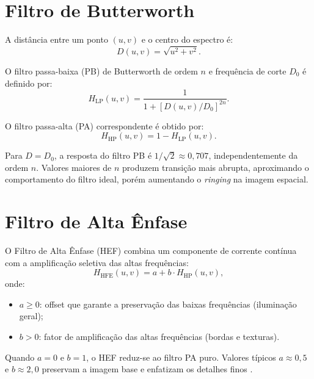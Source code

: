 \documentclass[12pt,a4paper,oneside,brazil,chapter=TITLE,section=TITLE]{abntex2}
\begin{document}
\section{Filtro de Butterworth}

A dist\^ancia entre um ponto $(u,v)$ e o centro do espectro \'e:
\begin{equation}
  D(u,v) = \sqrt{u^2 + v^2}.
\end{equation}

O filtro passa-baixa (PB) de Butterworth de ordem $n$ e frequ\^encia
de corte $D_0$ \'e definido por:
\begin{equation}
  H_{\text{LP}}(u,v) = \frac{1}{1 + \left[D(u,v)/D_0\right]^{2n}}.
  \label{eq:blp}
\end{equation}

O filtro passa-alta (PA) correspondente \'e obtido por:
\begin{equation}
  H_{\text{HP}}(u,v) = 1 - H_{\text{LP}}(u,v).
  \label{eq:bhp}
\end{equation}

Para $D = D_0$, a resposta do filtro PB \'e $1/\sqrt{2} \approx 0{,}707$,
independentemente da ordem $n$.
Valores maiores de $n$ produzem transi\c{c}\~ao mais abrupta, aproximando
o comportamento do filtro ideal, por\'em aumentando o \textit{ringing}
na imagem espacial.

\section{Filtro de Alta \^Enfase}

O Filtro de Alta \^Enfase (HEF) combina um componente de corrente
cont\'inua com a amplifica\c{c}\~ao seletiva das altas frequ\^encias:
\begin{equation}
  H_{\text{HFE}}(u,v) = a + b \cdot H_{\text{HP}}(u,v),
  \label{eq:hef}
\end{equation}
onde:
\begin{itemize}
  \item $a \geq 0$: offset que garante a preserva\c{c}\~ao das baixas
        frequ\^encias (ilumina\c{c}\~ao geral);
  \item $b > 0$: fator de amplifica\c{c}\~ao das altas frequ\^encias
        (bordas e texturas).
\end{itemize}

Quando $a = 0$ e $b = 1$, o HEF reduz-se ao filtro PA puro.
Valores t\'ipicos $a \approx 0{,}5$ e $b \approx 2{,}0$ preservam
a imagem base e enfatizam os detalhes finos \cite{gonzalez2018}.
\end{document}
